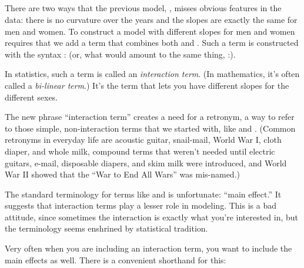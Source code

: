 \subsection{}
 
There are two ways that the previous model, ,  misses obvious features in the
data: there is no curvature over the years and the slopes are exactly
the same for men and women.  To construct a model with different
slopes for men and women requires that we add a term that combines
both  and .  Such a term is constructed with the syntax
: (or, what would amount to the same thing,
:).  

\begin{knitrout}
\end{knitrout}


In statistics, such a term is called an \emph{interaction term}.  (In
mathematics, it's often called a \emph{bi-linear term}.)  It's the
term that lets you have different slopes for the different sexes.  

The new phrase ``interaction term'' creates a need for a retronym, a way
to refer to those simple, non-interaction terms that we started with,
like  and .  (Common retronyms in everyday life are acoustic guitar, snail-mail, 
World War I, cloth diaper, and whole milk, compound terms that weren't needed
until electric guitars, e-mail, disposable diapers, and skim milk were
introduced, and World War II showed that the ``War to End All Wars''
was mis-named.)

The standard terminology for terms like  and  is unfortunate: ``main effect.'' 
It suggests that interaction terms play a lesser role in modeling.  This is a bad
attitude, since sometimes the interaction is exactly what you're
interested in, but the terminology seems enshrined by statistical tradition.

Very often when you are including an interaction term, you want to
include the main effects as well.  There is a convenient shorthand for
this: 

